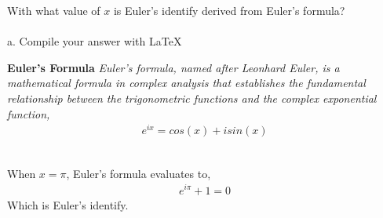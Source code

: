 With what value of $x$ is Euler's identify derived from Euler's formula?  \\\\
a. Compile your answer with \LaTeX \\

\begin{tcolorbox}
\textbf{
    Euler's Formula
} 
\textit{
    Euler's formula, named after Leonhard Euler, is a mathematical formula in complex analysis that establishes the fundamental relationship between the trigonometric functions and the complex exponential function,
}
\begin{align*}
    e^{ix} = cos(x) + i sin(x)
\end{align*}
\end{tcolorbox}

\begin{solution}\renewcommand{\qedsymbol}{}\ \\
When $x=\pi$, Euler's formula evaluates to,
\begin{align*}
    e^{i\pi }+1=0
\end{align*}
Which is Euler's identify.
\end{solution}